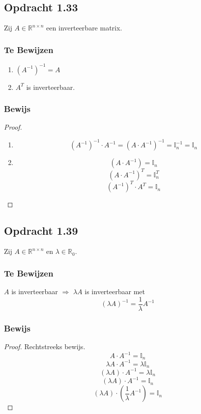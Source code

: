 \documentclass[lineaire_algebra_oplossingen.tex]{subfiles}
\begin{document}
\subsection{Opdracht 1.33}
\label{1.33}
Zij $A \in \mathbb{R}^{n\times n}$ een inverteerbare matrix.

\subsubsection*{Te Bewijzen}
\begin{enumerate}
\item $(A^{-1})^{-1} = A$
\item $A^T$ is inverteerbaar.
\end{enumerate}

\subsubsection*{Bewijs}
\begin{proof}
\begin{enumerate}
\item
\[
(A^{-1})^{-1}\cdot A^{-1} = (A \cdot A^{-1})^{-1} = \mathbb{I}_n^{-1} = \mathbb{I}_n
\]

\item
\[
(A\cdot A^{-1}) = \mathbb{I}_n
\]
\[
(A\cdot A^{-1})^T = \mathbb{I}_n^T
\]
\[
(A^{-1})^T \cdot A^T= \mathbb{I}_n
\]
\end{enumerate}
\end{proof}


\subsection{Opdracht 1.39}
\label{1.39}
Zij $A\in \mathbb{R}^{n\times n}$ en $\lambda \in \mathbb{R}_0$.
\subsubsection*{Te Bewijzen}
$A$ is inverteerbaar $\Rightarrow$ $\lambda A$ is inverteerbaar met 
\[
(\lambda A)^{-1} = \frac{1}{\lambda}A^{-1}
\]

\subsubsection*{Bewijs}
\begin{proof}
Rechtstreeks bewijs.\\
\[
A\cdot A^{-1} = \mathbb{I}_n
\]
\[
\lambda A\cdot A^{-1} = \lambda\mathbb{I}_n
\]
\[
(\lambda A)\cdot A^{-1} = \lambda\mathbb{I}_n
\]
\[
(\lambda A)\cdot A^{-1} = \mathbb{I}_n
\]
\[
(\lambda A)\cdot (\frac{1}{\lambda}A^{-1}) = \mathbb{I}_n
\]
\end{proof}
\end{document}
